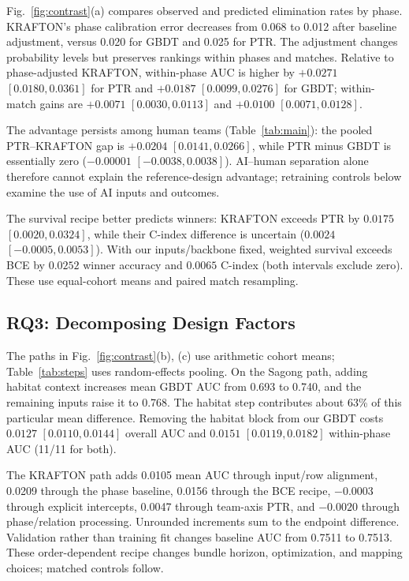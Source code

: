 \documentclass[sigconf,anonymous,nonacm]{acmart}
\begin{document}
Fig.~\ref{fig:contrast}(a) compares observed and predicted elimination rates by phase. KRAFTON's phase calibration error decreases from 0.068 to 0.012 after baseline adjustment, versus 0.020 for GBDT and 0.025 for PTR. The adjustment changes probability levels but preserves rankings within phases and matches. Relative to phase-adjusted KRAFTON, within-phase AUC is higher by $+0.0271$ $[0.0180,\allowbreak 0.0361]$ for PTR and $+0.0187$ $[0.0099,\allowbreak 0.0276]$ for GBDT; within-match gains are $+0.0071$ $[0.0030,\allowbreak 0.0113]$ and $+0.0100$ $[0.0071,\allowbreak 0.0128]$.

The advantage persists among human teams (Table~\ref{tab:main}): the pooled PTR--KRAFTON gap is $+0.0204$ $[0.0141,\allowbreak 0.0266]$, while PTR minus GBDT is essentially zero ($-0.00001$ $[-0.0038,\allowbreak 0.0038]$). AI--human separation alone therefore cannot explain the reference-design advantage; retraining controls below examine the use of AI inputs and outcomes.

The survival recipe better predicts winners: KRAFTON exceeds PTR by $0.0175$ $[0.0020,\allowbreak 0.0324]$, while their C-index difference is uncertain ($0.0024$ $[-0.0005,\allowbreak 0.0053]$). With our inputs/backbone fixed, weighted survival exceeds BCE by $0.0252$ winner accuracy and $0.0065$ C-index (both intervals exclude zero). These use equal-cohort means and paired match resampling.

\subsection{RQ3: Decomposing Design Factors}
\label{sec:results:rq3}


The paths in Fig.~\ref{fig:contrast}(b), (c) use arithmetic cohort means; Table~\ref{tab:steps} uses random-effects pooling. On the Sagong path, adding habitat context increases mean GBDT AUC from 0.693 to 0.740, and the remaining inputs raise it to 0.768. The habitat step contributes about 63\% of this particular mean difference. Removing the habitat block from our GBDT costs $0.0127$ $[0.0110,\allowbreak 0.0144]$ overall AUC and $0.0151$ $[0.0119,\allowbreak 0.0182]$ within-phase AUC (11/11 for both).

The KRAFTON path adds 0.0105 mean AUC through input/row alignment, 0.0209 through the phase baseline, 0.0156 through the BCE recipe, $-0.0003$ through explicit intercepts, 0.0047 through team-axis PTR, and $-0.0020$ through phase/relation processing. Unrounded increments sum to the endpoint difference. Validation rather than training fit changes baseline AUC from 0.7511 to 0.7513. These order-dependent recipe changes bundle horizon, optimization, and mapping choices; matched controls follow.
\end{document}
